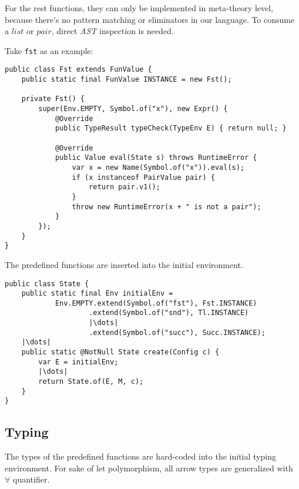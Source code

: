 \documentclass[a4paper]{article}
\begin{document}
For the rest functions, they can only be implemented in meta-theory level,
because there's no pattern matching or eliminators in our language.
To consume a $list$ or $pair$, direct \textit{AST} inspection is needed.

Take \texttt{fst} as an example:

\begin{verbatim}
public class Fst extends FunValue {
    public static final FunValue INSTANCE = new Fst();

    private Fst() {
        super(Env.EMPTY, Symbol.of("x"), new Expr() {
            @Override
            public TypeResult typeCheck(TypeEnv E) { return null; }

            @Override
            public Value eval(State s) throws RuntimeError {
                var x = new Name(Symbol.of("x")).eval(s);
                if (x instanceof PairValue pair) {
                    return pair.v1();
                }
                throw new RuntimeError(x + " is not a pair");
            }
        });
    }
}
\end{verbatim}

The predefined functions are inserted into the initial environment.

\begin{verbatim}
public class State {
    public static final Env initialEnv =
            Env.EMPTY.extend(Symbol.of("fst"), Fst.INSTANCE)
                    .extend(Symbol.of("snd"), Tl.INSTANCE)
                    |\dots|
                    .extend(Symbol.of("succ"), Succ.INSTANCE);
    |\dots|
    public static @NotNull State create(Config c) {
        var E = initialEnv;
        |\dots|
        return State.of(E, M, c);
    }
}
\end{verbatim}

\subsection{Typing}

The types of the predefined functions are hard-coded into the initial typing environment.
For sake of let polymorphism, all arrow types are generalized with $\forall$ quantifier.
\end{document}
